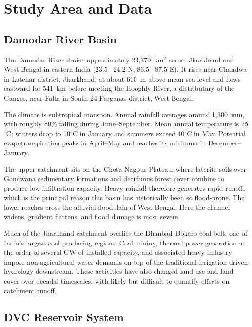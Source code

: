 \documentclass[12pt,a4paper,oneside]{report}
\begin{document}
\chapter{Study Area and Data}
\label{ch:study}

\section{Damodar River Basin}

The Damodar River drains approximately 23,370~km$^2$ across Jharkhand and
West Bengal in eastern India
($23.5^\circ$--$24.2^\circ$N, $86.5^\circ$--$87.5^\circ$E). It rises near
Chandwa in Latehar district, Jharkhand, at about 610~m above mean sea level
and flows eastward for 541~km before meeting the Hooghly River, a
distributary of the Ganges, near Falta in South 24 Parganas district, West
Bengal.

The climate is subtropical monsoon. Annual rainfall averages around
1,300~mm, with roughly 80\% falling during June--September. Mean annual
temperature is 25$^\circ$C; winters drop to 10$^\circ$C in January and
summers exceed 40$^\circ$C in May. Potential evapotranspiration peaks in
April--May and reaches its minimum in December--January.

The upper catchment sits on the Chota Nagpur Plateau, where laterite soils
over Gondwana sedimentary formations and deciduous forest cover combine to
produce low infiltration capacity. Heavy rainfall therefore generates rapid
runoff, which is the principal reason this basin has historically been so
flood-prone. The lower reaches cross the alluvial floodplain of West Bengal.
Here the channel widens, gradient flattens, and flood damage is most severe.

Much of the Jharkhand catchment overlies the Dhanbad--Bokaro coal belt, one
of India's largest coal-producing regions. Coal mining, thermal power
generation on the order of several GW of installed capacity, and associated
heavy industry impose non-agricultural water demands on top of the
traditional irrigation-driven hydrology downstream. These activities have
also changed land use and land cover over decadal timescales, with likely
but difficult-to-quantify effects on catchment runoff.

\section{DVC Reservoir System}
\end{document}
